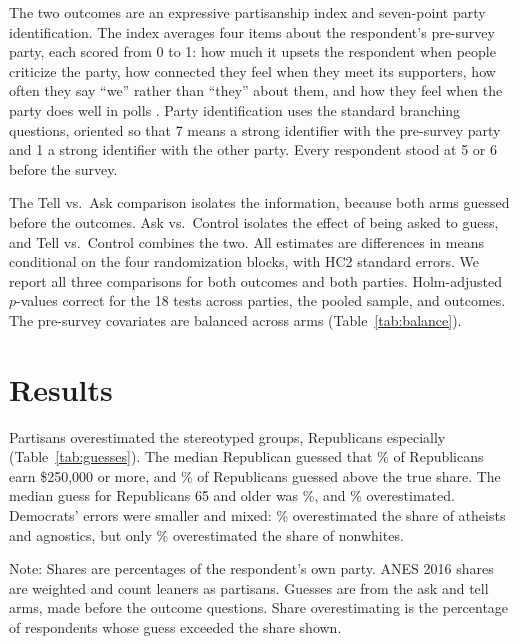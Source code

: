\documentclass[11pt]{article}
\newcommand{\TableStyle}{\small\setlength{\tabcolsep}{5pt}\renewcommand{\arraystretch}{1.05}}
\begin{document}
The two outcomes are an expressive partisanship index and seven-point party identification. The index averages four items about the respondent's pre-survey party, each scored from 0 to 1: how much it upsets the respondent when people criticize the party, how connected they feel when they meet its supporters, how often they say ``we'' rather than ``they'' about them, and how they feel when the party does well in polls \citep{huddy2015}. Party identification uses the standard branching questions, oriented so that 7 means a strong identifier with the pre-survey party and 1 a strong identifier with the other party. Every respondent stood at 5 or 6 before the survey.

The Tell vs.\ Ask comparison isolates the information, because both arms guessed before the outcomes. Ask vs.\ Control isolates the effect of being asked to guess, and Tell vs.\ Control combines the two. All estimates are differences in means conditional on the four randomization blocks, with HC2 standard errors. We report all three comparisons for both outcomes and both parties. Holm-adjusted $p$-values correct for the 18 tests across parties, the pooled sample, and outcomes. The pre-survey covariates are balanced across arms (Table~\ref{tab:balance}).

\section{Results}

Partisans overestimated the stereotyped groups, Republicans especially (Table~\ref{tab:guesses}). The median Republican guessed that \guessRich\% of Republicans earn \$250,000 or more, and \overRich\% of Republicans guessed above the true share. The median guess for Republicans 65 and older was \guessOld\%, and \overOld\% overestimated. Democrats' errors were smaller and mixed: \overAtheist\% overestimated the share of atheists and agnostics, but only \overNonwhite\% overestimated the share of nonwhites.

\begin{table}[H]
\centering
\caption{Shares shown in the tell arm, ANES 2016 shares, and respondents' guesses}
\label{tab:guesses}
{\TableStyle{}}
\par\smallskip
\begin{minipage}{0.95\linewidth}\footnotesize
Note: Shares are percentages of the respondent's own party. ANES 2016 shares are weighted and count leaners as partisans. Guesses are from the ask and tell arms, made before the outcome questions. Share overestimating is the percentage of respondents whose guess exceeded the share shown.
\end{minipage}
\end{table}
\end{document}
